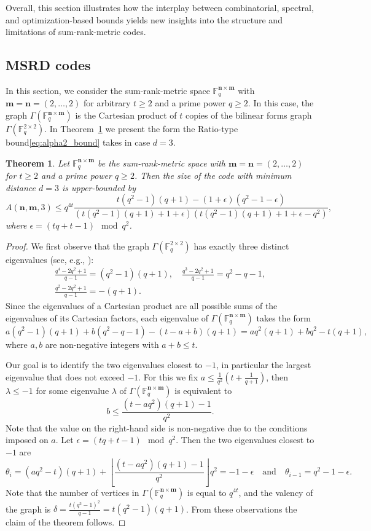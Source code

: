 \documentclass[a4paper]{article}
\newtheorem{theorem}[formula]{Theorem}
\newcommand{\F}{\mathbb{F}}
\newcommand{\bfn}{\mathbf {n}}
\newcommand{\bfm}{\mathbf {m}}
\newcommand{\spac}{\F^{\bfn\times\bfm}_q}
\newcommand{\floor}[1]{{\left\lfloor{#1}\right\rfloor}}
\begin{document}
Overall, this section illustrates how the interplay between combinatorial, spectral, and optimization-based bounds yields new insights into the structure and limitations of sum-rank-metric codes.

\subsection{MSRD codes}

In this section, we consider the sum-rank-metric space $\spac$ with $\bfm=\bfn=(2,\dots,2)$ for arbitrary $t\geq2$ and a prime power $q\geq2$. In this case, the graph $\Gamma(\spac)$ is the Cartesian product of $t$ copies of the bilinear forms graph $\Gamma(\F_q^{2\times 2})$. In Theorem~\ref{thm:RT22} we present the form the Ratio-type bound\:\eqref{eq:alpha2_bound} takes in case $d=3$.

\begin{theorem}\label{thm:RT22} Let $\spac$ be the sum-rank-metric space with $\bfm=\bfn=(2,\dots,2)$ for $t\geq2$ and a prime power $q\geq2$. Then the size of the code with minimum distance $d=3$ is upper-bounded by
$$A(\bfn,\bfm,3)\leq q^{4t}\frac{t(q^2-1)(q+1)-(1+\epsilon)(q^2-1-\epsilon)}{(t(q^2-1)(q+1)+1+\epsilon)(t(q^2-1)(q+1)+1+\epsilon-q^2)},$$
where $\epsilon=(tq+t-1)\mod q^2$.
\end{theorem}

\begin{proof}
    We first observe that the graph $\Gamma(\F_q^{2\times 2})$ has exactly three distinct eigenvalues (see, e.g., \cite[ Corollary 8.4.2]{BCNbookDRG}):
    \begin{gather*}
    \frac{q^4-2q^2+1}{q-1}=(q^2-1)(q+1),\quad \frac{q^3-2q^2+1}{q-1}=q^2-q-1,\\ \frac{q^2-2q^2+1}{q-1}=-(q+1).    
    \end{gather*}
    Since the eigenvalues of a Cartesian product are all possible sums of the eigenvalues of its Cartesian factors, each eigenvalue of $\Gamma(\spac)$ takes the form
    $$a(q^2-1)(q+1)+b(q^2-q-1)-(t-a+b)(q+1)=aq^2(q+1)+bq^2-t(q+1),$$
    where $a,b$ are non-negative integers with $a+b\leq t$.

    Our goal is to identify the two eigenvalues closest to $-1$, in particular the largest eigenvalue that does not exceed $-1$. For this we fix $a\leq\frac1{q^2}\left(t+\frac1{q+1}\right)$, then $\lambda\leq -1$ for some eigenvalue $\lambda$ of $\Gamma(\spac)$ is equivalent to
    $$b\leq\frac{(t-aq^2)(q+1)-1}{q^2}.$$
    Note that the value on the right-hand side is non-negative due to the conditions imposed on $a$. Let $\epsilon = (tq+t-1)\mod q^2$. Then the two eigenvalues closest to $-1$ are
    $$\theta_i=(aq^2-t)(q+1)+\floor{\frac{(t-aq^2)(q+1)-1}{q^2}}q^2 = -1 -\epsilon\quad\text{and}\quad \theta_{i-1}=q^2-1 -\epsilon.$$
    Note that the number of vertices in $\Gamma(\spac)$ is equal to $q^{4t}$, and the valency of the graph is $\delta=\frac{t(q^2-1)^2}{q-1}=t(q^2-1)(q+1)$. From these observations the claim of the theorem follows.
\end{proof}
\end{document}
